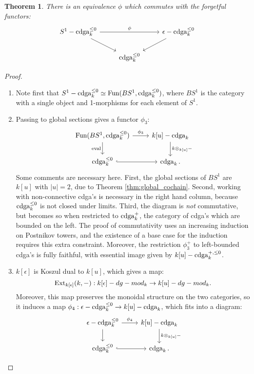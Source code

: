 \documentclass[10pt,a4paper,reqno,oneside]{book} %
\theoremstyle{plain}
\newtheorem{thm}{Theorem}[section]
\theoremstyle{definition}
\theoremstyle{remark}
\numberwithin{equation}{section}
\begin{document}
\begin{thm}
There is an equivalence $\phi$ which commutes with the forgetful functors:
\[
\begin{tikzcd}
S^1 - \cdga_k^{\leq 0}\arrow{rr}{\phi}\arrow{dr} & & \epsilon - \cdga_k^{\leq 0}\arrow{dl} \\
 & \cdga_k^{\leq 0} & 
\end{tikzcd}
\]
\end{thm}
\begin{proof}
   
\begin{enumerate}
\item Note first that $S^1-\operatorname{cdga}_k^{\leq 0} \simeq \operatorname{Fun}(BS^1, \operatorname{cdga}_k^{\leq 0})$, where $BS^1$ is the category with a single
object and 1-morphisms for each element of $S^1$.
\item Passing to global sections gives a functor $\phi_3$:
\[
\begin{tikzcd}
\Fun(BS^1, \cdga_k^{\leq 0})\arrow{r}{\phi_3}\arrow[swap]{d}{\text{eval}} & k[u]-\cdga_k\arrow{d}{k\otimes_{k[u]} -} \\
\cdga_k^{\leq 0}\arrow[hook]{r} & \cdga_k .
\end{tikzcd}
\]
Some comments are necessary here. First, the global sections of $BS^1$ are $k[u]$ with $|u| = 2$, due to Theorem
\ref{thm:global_cochain}. Second, working with non-connective cdga's is necessary in the right hand column, because
$\operatorname{cdga}_k^{\leq 0}$ is not closed under limits. Third, the diagram is \emph{not} commutative, but becomes so when restricted
to $\operatorname{cdga}^+_k$, the category of cdga's which are bounded on the left. The proof of commutativity uses an increasing induction
on Postnikov towers, and the existence of a base case for the induction requires this extra constraint. Moreover,
the restriction $\phi_3^+$ to left-bounded cdga's is fully faithful, with essential image given by $k[u]-\operatorname{cdga}_k^{+,\leq 0}$.
\item $k[\epsilon]$ is Koszul dual to $k[u]$, which gives a map:
\[	\operatorname{Ext}_{k[\epsilon]}(k,-) : k[\epsilon] - dg-mod_k \to k[u] - dg-mod_k.	\]
Moreover, this map preserves the monoidal structure on the two categories, so it induces a map $\phi_4: \epsilon-\operatorname{cdga}_k^{\leq 0}
\to k[u] -\operatorname{cdga}_k$, which fits into a diagram:
\[
\begin{tikzcd}
\epsilon-\cdga_k^{\leq 0}\arrow{r}{\phi_4}\arrow{d} & k[u]-\cdga_k\arrow{d}{k\otimes_{k[u]} -} \\
\cdga_k^{\leq 0}\arrow[hook]{r} & \cdga_k .
\end{tikzcd}
\]
\end{enumerate}
\end{proof}
\end{document}
